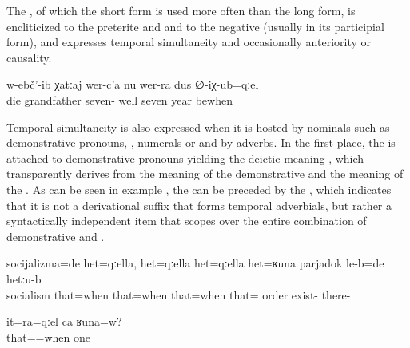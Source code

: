 The  , of which the short form is used more often than the long form, is encliticized to the preterite and  and to the negative  (usually in its participial form), and expresses temporal simultaneity  and occasionally anteriority or causality. 

\begin{exe}
	\ex	\label{ex:‎Grandfather died when he was 77 years old}
	\gll	w-ebč'-ib	χatːaj	wer-c'a	nu	wer-ra	dus	∅-iχ-ub=qːel\\
		die	grandfather	seven-	well seven	year	bewhen\\
	\glt	{}
\end{exe}

Temporal simultaneity is also expressed when it is hosted by nominals such as demonstrative pronouns, , numerals or  and by adverbs. In the first place, the  is attached to demonstrative pronouns yielding the deictic meaning , which transparently derives from the meaning of the demonstrative and the meaning of the  . As can be seen in example , the  can be preceded by the , which indicates that it is not a derivational suffix that forms temporal adverbials, but rather a syntactically independent item that scopes over the entire combination of demonstrative and . 

\begin{exe}
	\ex	\label{ex:‎Socialism was at that time}
	\gll	socijalizma=de	het=qːella, het=qːella het=qːella het=ʁuna parjadok le-b=de hetːu-b\\
		socialism	that=when that=when that=when that= order exist- there-\\
	\glt	{}
		
	\ex	\label{ex:(Is this) that time also one and the same (shirt)?}
		\gll it=ra=qːel	ca	ʁuna=w?\\
			that==when	one	 \\
		\glt {}
\end{exe}


